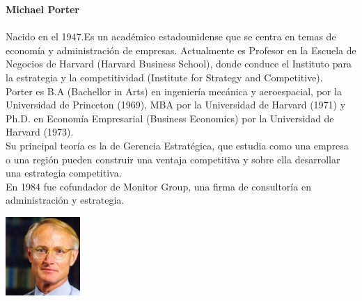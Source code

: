 \textbf{Michael Porter}\\\\
Nacido en el 1947.Es un académico estadounidense que se centra en temas de economía y administración
de empresas. Actualmente es Profesor en la Escuela de Negocios de Harvard (Harvard
Business School), donde conduce el Instituto para la estrategia y la competitividad
(Institute for Strategy and Competitive).\\

Porter es B.A (Bachellor in Arts) en ingeniería mecánica y aeroespacial, por la
Universidad de Princeton (1969), MBA por la Universidad de Harvard (1971) y Ph.D.
en Economía Empresarial (Business Economics) por la Universidad de Harvard (1973).\\

Su principal teoría es la de Gerencia Estratégica, que estudia como una empresa o
una región pueden construir una ventaja competitiva y sobre ella desarrollar una
estrategia competitiva.\\

En 1984 fue cofundador de Monitor Group, una firma de consultoría en administración
y estrategia.\\

\begin{center}
\includegraphics[height=3cm]{images/porter}
\end{center}
\newpage
